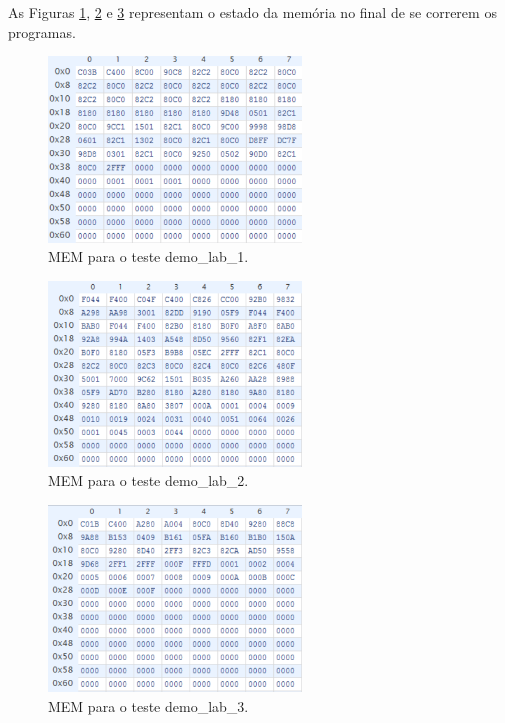 \documentclass[a4paper]{article}
\begin{document}
		As Figuras \ref{fig:imem_1}, \ref{fig:imem_2} e \ref{fig:imem_3} representam o estado da memória no final de se correrem os programas.
		
		\begin{figure}[Hp]
			\centering
			\includegraphics[width=0.6\textwidth]{img/imem_1}
			\caption{MEM para o teste demo\_lab\_1.}
			\label{fig:imem_1}
		\end{figure}
		\begin{figure}[Hp]
			\centering
			\includegraphics[width=0.6\textwidth]{img/imem_2}
			\caption{MEM para o teste demo\_lab\_2.}
			\label{fig:imem_2}
		\end{figure}
		\begin{figure}[Hp]
			\centering
			\includegraphics[width=0.6\textwidth]{img/imem_3}
			\caption{MEM para o teste demo\_lab\_3.}
			\label{fig:imem_3}
		\end{figure}
		
\end{document}
